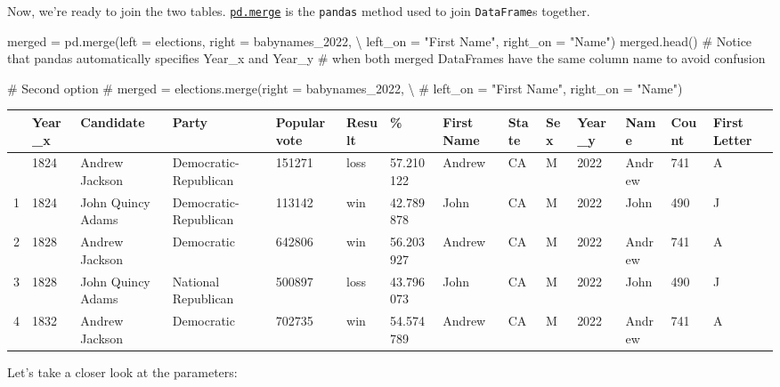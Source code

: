 \documentclass[
  letterpaper,
  DIV=11,
  numbers=noendperiod]{scrreprt}
\newenvironment{Shaded}{\begin{snugshade}}{\end{snugshade}}
\newcommand{\CommentTok}[1]{\textcolor[rgb]{0.37,0.37,0.37}{#1}}
\newcommand{\NormalTok}[1]{\textcolor[rgb]{0.00,0.23,0.31}{#1}}
\newcommand{\OperatorTok}[1]{\textcolor[rgb]{0.37,0.37,0.37}{#1}}
\newcommand{\StringTok}[1]{\textcolor[rgb]{0.13,0.47,0.30}{#1}}
\begin{document}
Now, we're ready to join the two tables.
\href{https://pandas.pydata.org/docs/reference/api/pandas.DataFrame.merge.html}{\texttt{pd.merge}}
is the \texttt{pandas} method used to join \texttt{DataFrame}s together.

\begin{Shaded}
\begin{Highlighting}[]
\NormalTok{merged }\OperatorTok{=}\NormalTok{ pd.merge(left }\OperatorTok{=}\NormalTok{ elections, right }\OperatorTok{=}\NormalTok{ babynames\_2022, }\OperatorTok{\textbackslash{}}
\NormalTok{                  left\_on }\OperatorTok{=} \StringTok{"First Name"}\NormalTok{, right\_on }\OperatorTok{=} \StringTok{"Name"}\NormalTok{)}
\NormalTok{merged.head()}
\CommentTok{\# Notice that pandas automatically specifies \textasciigrave{}Year\_x\textasciigrave{} and \textasciigrave{}Year\_y\textasciigrave{} }
\CommentTok{\# when both merged DataFrames have the same column name to avoid confusion}

\CommentTok{\# Second option}
\CommentTok{\# merged = elections.merge(right = babynames\_2022, \textbackslash{}}
    \CommentTok{\# left\_on = "First Name", right\_on = "Name")}
\end{Highlighting}
\end{Shaded}

\begin{longtable}[]{@{}llllllllllllll@{}}
\toprule\noalign{}
& Year\_x & Candidate & Party & Popular vote & Result & \% & First Name
& State & Sex & Year\_y & Name & Count & First Letter \\
\midrule\noalign{}
\endhead
\bottomrule\noalign{}
\endlastfoot
0 & 1824 & Andrew Jackson & Democratic-Republican & 151271 & loss &
57.210122 & Andrew & CA & M & 2022 & Andrew & 741 & A \\
1 & 1824 & John Quincy Adams & Democratic-Republican & 113142 & win &
42.789878 & John & CA & M & 2022 & John & 490 & J \\
2 & 1828 & Andrew Jackson & Democratic & 642806 & win & 56.203927 &
Andrew & CA & M & 2022 & Andrew & 741 & A \\
3 & 1828 & John Quincy Adams & National Republican & 500897 & loss &
43.796073 & John & CA & M & 2022 & John & 490 & J \\
4 & 1832 & Andrew Jackson & Democratic & 702735 & win & 54.574789 &
Andrew & CA & M & 2022 & Andrew & 741 & A \\
\end{longtable}

Let's take a closer look at the parameters:
\end{document}
